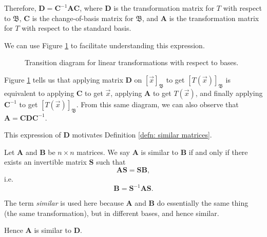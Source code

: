 \documentclass[]{book}
\newcommand{\inv}[1]{\ensuremath{{#1}^{-1}}}
\newcommand{\invm}[1]{\ensuremath{\inv{\mat{#1}}}}
\newcommand{\bas}[1]{\ensuremath{\mathfrak{#1}}}
\newcommand{\coordb}[2]{\ensuremath{\left[#1\right]_{#2}}}
\newcommand{\mat}[1]{\ensuremath{\mathbf{#1}}}
\begin{document}
Therefore, $\mat{D} = \invm{C}\mat{A}\mat{C}$, where $\mat{D}$ is the transformation matrix for $T$ with respect to $\bas{B}$, $\mat{C}$ is the change-of-basis matrix for $\bas{B}$, and $\mat{A}$ is the transformation matrix for $T$ with respect to the standard basis. 

We can use Figure \ref{fig: linear transformation with respect to bases} to facilitate understanding this expression.
\begin{figure}[H]
    \centering
    \caption{Transition diagram for linear transformations with respect to bases.}
    \label{fig: linear transformation with respect to bases}
\end{figure}

Figure \ref{fig: linear transformation with respect to bases} tells us that applying matrix $\mat{D}$ on $\coordb{\vec{x}}{\bas{B}}$ to get $\coordb{T(\vec{x})}{\bas{B}}$ is equivalent to applying $\mat{C}$ to get $\vec{x}$, applying $\mat{A}$ to get $T(\vec{x})$, and finally applying $\invm{C}$ to get $\coordb{T(\vec{x})}{\bas{B}}$. From this same diagram, we can also observe that $\mat{A} = \mat{C}\mat{D}\invm{C}$.

This expression of $\mat{D}$ motivates Definition \ref{defn: similar matrices}.
\begin{definition}
    \label{defn: similar matrices}
    Let $\mat{A}$ and $\mat{B}$ be $n \times n$ matrices. We say $\mat{A}$ is similar to $\mat{B}$ if and only if there exists an invertible matrix $\mat{S}$ such that
    \[\mat{A}\mat{S} = \mat{S}\mat{B},\]
    i.e.
    \[\mat{B} = \invm{S}\mat{A}\mat{S}.\]
    
    The term \textit{similar} is used here because $\mat{A}$ and $\mat{B}$ do essentially the same thing (the same transformation), but in different bases, and hence similar.
\end{definition}
Hence $\mat{A}$ is similar to $\mat{D}$. 
\end{document}
